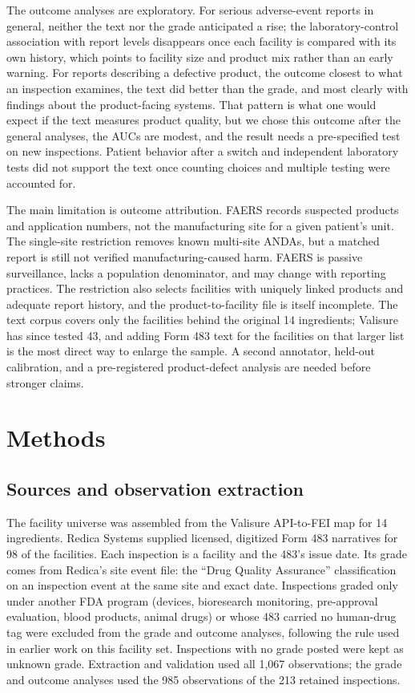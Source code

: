 \documentclass[12pt]{article}
\begin{document}
The outcome analyses are exploratory. For serious adverse-event reports in
general, neither the text nor the grade anticipated a rise; the
laboratory-control association with report levels disappears once each
facility is compared with its own history, which points to facility size
and product mix rather than an early warning. For reports describing a
defective product, the outcome closest to what an inspection examines, the
text did better than the grade, and most clearly with findings about the
product-facing systems. That pattern is what one would expect if the text
measures product quality, but we chose this outcome after the general
analyses, the AUCs are modest, and the result needs a pre-specified test on
new inspections. Patient behavior after a switch and independent laboratory
tests did not support the text once counting choices and multiple testing
were accounted for.

The main limitation is outcome attribution. FAERS records suspected
products and application numbers, not the manufacturing site for a given
patient's unit. The single-site restriction removes known multi-site ANDAs,
but a matched report is still not verified manufacturing-caused harm.
FAERS is passive surveillance, lacks a population denominator, and may
change with reporting practices. The restriction also selects facilities
with uniquely linked products and adequate report history, and the
product-to-facility file is itself incomplete. The text corpus covers only
the facilities behind the original 14 ingredients; Valisure has since
tested 43, and adding Form 483 text for the facilities on that larger list
is the most direct way to enlarge the sample. A second annotator, held-out
calibration, and a pre-registered product-defect analysis are needed before
stronger claims.

\section{Methods}
\label{sec:methods}

\subsection{Sources and observation extraction}

The facility universe was assembled from the Valisure API-to-FEI map for
14 ingredients. Redica Systems supplied licensed, digitized Form 483
narratives for 98 of the facilities. Each inspection is a facility and the
483's issue date. Its grade comes from Redica's site event file: the
``Drug Quality Assurance'' classification on an inspection event at the
same site and exact date. Inspections graded only under another FDA
program (devices, bioresearch monitoring, pre-approval evaluation, blood
products, animal drugs) or whose 483 carried no human-drug tag were
excluded from the grade and outcome analyses, following the rule used in
earlier work on this facility set. Inspections with no grade posted were
kept as unknown grade. Extraction and validation used all 1,067
observations; the grade and outcome analyses used the 985 observations of
the 213 retained inspections.
\end{document}
